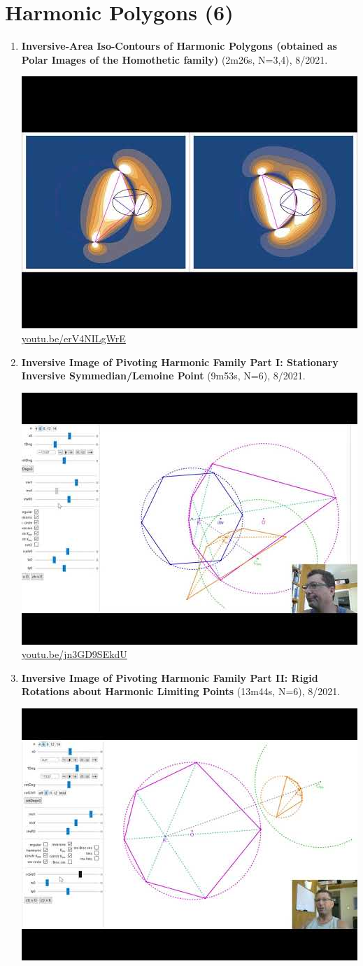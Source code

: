 \documentclass[12pt]{amsart}
\begin{document}
\section{Harmonic Polygons (6)}

\begin{enumerate}[resume]
\item \textbf{Inversive-Area Iso-Contours of Harmonic Polygons (obtained as Polar Images of the Homothetic family)} (2m26s, N=3,4), 8/2021. 
\begin{center}\includegraphics[width=.5\textwidth]{pics/erV4NILgWrE.jpg} \\ 
\href{https://youtu.be/erV4NILgWrE}{\url{youtu.be/erV4NILgWrE}}\end{center}
% 
\item \textbf{Inversive Image of Pivoting Harmonic Family Part I: Stationary Inversive Symmedian/Lemoine Point} (9m53s, N=6), 8/2021. 
\begin{center}\includegraphics[width=.5\textwidth]{pics/jn3GD9SEkdU.jpg} \\ 
\href{https://youtu.be/jn3GD9SEkdU}{\url{youtu.be/jn3GD9SEkdU}}\end{center}
% 
\item \textbf{Inversive Image of Pivoting Harmonic Family Part II: Rigid Rotations about Harmonic Limiting Points} (13m44s, N=6), 8/2021. 
\begin{center}\includegraphics[width=.5\textwidth]{pics/9GwfELl-tHk.jpg} \\ 

\end{center}
\end{enumerate}
\end{document}
